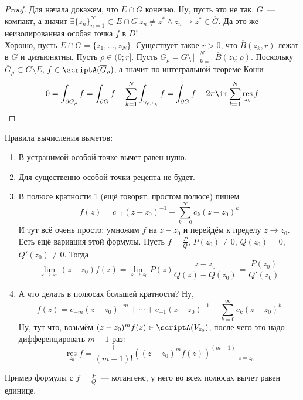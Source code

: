 \documentclass{article}
\begin{document}
    \begin{proof}
        Для начала докажем, что $E\cap G$ конечно. Ну, пусть это не так. $\overline G$~--- компакт, а значит $\exists\{z_n\}_{n=1}^\infty\subset E\cap G~z_n\neq z^*\land z_n\to z^*\in\overline G$. Да это же неизолированная особая точка $f$ в $D$!\\
        Хорошо, пусть $E\cap G=\{z_1,\ldots,z_N\}$. Существует такое $r>0$, что $\overline B(z_k,r)$ лежат в $G$ и дизъюнктны. Пусть $\rho\in(0;r]$. Пусть $G_\rho=G\setminus\bigsqcup\limits_{k=1}^N\overline B(z_k;\rho)$. Поскольку $\overline G_\rho\subset G\setminus E$, $f\in\scriptA(\overline G_\rho)$, а значит по интегральной теореме Коши
        $$
        0=\int_{\partial G_\rho}f=\int_{\partial G}f-\sum\limits_{k=1}^N\int_{\gamma_{\rho,z_k}}f=\int_{\partial G}f-2\pi\im\sum\limits_{k=1}^N\operatorname*{res}_{z_k}f
        $$
    \end{proof}
    \begin{remark}
        Правила вычисления вычетов:
        \begin{enumerate}
            \item В устранимой особой точке вычет равен нулю.
            \item Для существенно особой точки рецепта не будет.
            \item В полюсе кратности 1 (ещё говорят, простом полюсе) пишем
            $$
            f(z)=c_{-1}(z-z_0)^{-1}+\sum\limits_{k=0}^\infty c_k(z-z_0)^k
            $$
            И тут всё очень просто: умножим $f$ на $z-z_0$ и перейдём к пределу $z\to z_0$.\\
            Есть ещё вариация этой формулы. Пусть $f=\frac PQ$, $P(z_0)\neq0$, $Q(z_0)=0$, $Q'(z_0)\neq0$. Тогда
            $$
            \lim\limits_{z\to z_0}(z-z_0)f(z)=\lim\limits_{z\to z_0}P(z)\frac{z-z_0}{Q(z)-Q(z_0)}=\frac{P(z_0)}{Q'(z_0)}
            $$
            \item А что делать в полюсах большей кратности? Ну,
            $$
            f(z)=c_{-m}(z-z_0)^{-m}+\cdots+c_{-1}(z-z_0)^{-1}+\sum\limits_{k=0}^\infty c_k(z-z_0)^k
            $$
            Ну, тут что, возьмём $(z-z_0)^mf(z)\in\scriptA(V_{z_0})$, после чего это надо дифференцировать $m-1$ раз:
            $$
            \operatorname*{res}_{z_0}f=\frac1{(m-1)!}\left((z-z_0)^mf(z)\right)^{(m-1)}\bigg|_{z=z_0}
            $$
        \end{enumerate}
    \end{remark}
    \begin{example}
        Пример формулы с $f=\frac PQ$~--- котангенс, у него во всех полюсах вычет равен единице.
    \end{example}
\end{document}
